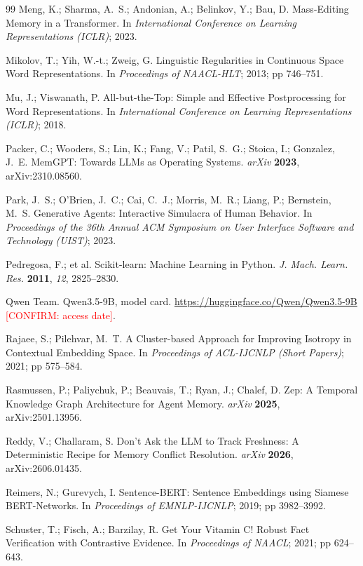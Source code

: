 \documentclass[journal=jcisd8,manuscript=article]{achemso}
\newcommand{\confirm}[1]{\textcolor{red}{[CONFIRM: #1]}} %
\begin{document}
\begin{thebibliography}{99}
 Meng, K.; Sharma, A.~S.; Andonian, A.; Belinkov, Y.; Bau, D. Mass-Editing Memory in a Transformer. In \emph{International Conference on Learning Representations (ICLR)}; 2023.

 Mikolov, T.; Yih, W.-t.; Zweig, G. Linguistic Regularities in Continuous Space Word Representations. In \emph{Proceedings of NAACL-HLT}; 2013; pp 746--751.

 Mu, J.; Viswanath, P. All-but-the-Top: Simple and Effective Postprocessing for Word Representations. In \emph{International Conference on Learning Representations (ICLR)}; 2018.

 Packer, C.; Wooders, S.; Lin, K.; Fang, V.; Patil, S.~G.; Stoica, I.; Gonzalez, J.~E. MemGPT: Towards LLMs as Operating Systems. \emph{arXiv} \textbf{2023}, arXiv:2310.08560.

 Park, J.~S.; O'Brien, J.~C.; Cai, C.~J.; Morris, M.~R.; Liang, P.; Bernstein, M.~S. Generative Agents: Interactive Simulacra of Human Behavior. In \emph{Proceedings of the 36th Annual ACM Symposium on User Interface Software and Technology (UIST)}; 2023.

 Pedregosa, F.; et al. Scikit-learn: Machine Learning in Python. \emph{J. Mach. Learn. Res.} \textbf{2011}, \emph{12}, 2825--2830.

 Qwen Team. Qwen3.5-9B, model card. \url{https://huggingface.co/Qwen/Qwen3.5-9B} \confirm{access date}.

 Rajaee, S.; Pilehvar, M.~T. A Cluster-based Approach for Improving Isotropy in Contextual Embedding Space. In \emph{Proceedings of ACL-IJCNLP (Short Papers)}; 2021; pp 575--584.

 Rasmussen, P.; Paliychuk, P.; Beauvais, T.; Ryan, J.; Chalef, D. Zep: A Temporal Knowledge Graph Architecture for Agent Memory. \emph{arXiv} \textbf{2025}, arXiv:2501.13956.

 Reddy, V.; Challaram, S. Don't Ask the LLM to Track Freshness: A Deterministic Recipe for Memory Conflict Resolution. \emph{arXiv} \textbf{2026}, arXiv:2606.01435.

 Reimers, N.; Gurevych, I. Sentence-BERT: Sentence Embeddings using Siamese BERT-Networks. In \emph{Proceedings of EMNLP-IJCNLP}; 2019; pp 3982--3992.

 Schuster, T.; Fisch, A.; Barzilay, R. Get Your Vitamin C! Robust Fact Verification with Contrastive Evidence. In \emph{Proceedings of NAACL}; 2021; pp 624--643.


\end{thebibliography}
\end{document}
